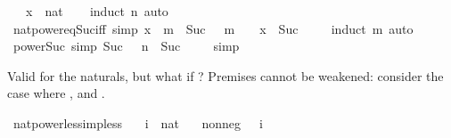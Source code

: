 \begin{isabellebody}
\ \ \ x\ {\isacharcolon}{\kern0pt}{\isacharcolon}{\kern0pt}\ nat\isanewline
%
\isadelimproof
\ \ %
\endisadelimproof
%
\isatagproof
{}\isamarkupfalse%
\ {\isacharparenleft}{\kern0pt}induct\ n{\isacharparenright}{\kern0pt}\ auto%
\endisatagproof
{\isafoldproof}%
%
\isadelimproof
\isanewline
%
\endisadelimproof
\isanewline
{}\isamarkupfalse%
\ nat{\isacharunderscore}{\kern0pt}power{\isacharunderscore}{\kern0pt}eq{\isacharunderscore}{\kern0pt}Suc{\isacharunderscore}{\kern0pt}{}{\isacharunderscore}{\kern0pt}iff\ {\isacharbrackleft}{\kern0pt}simp{\isacharbrackright}{\kern0pt}{\isacharcolon}{\kern0pt}\ {\isachardoublequoteopen}x\ {\isacharcircum}{\kern0pt}\ m\ {\isacharequal}{\kern0pt}\ Suc\ {}\ {\isasymlongleftrightarrow}\ m\ {\isacharequal}{\kern0pt}\ {}\ {\isasymor}\ x\ {\isacharequal}{\kern0pt}\ Suc\ {}{\isachardoublequoteclose}\isanewline
%
\isadelimproof
\ \ %
\endisadelimproof
%
\isatagproof
{}\isamarkupfalse%
\ {\isacharparenleft}{\kern0pt}induct\ m{\isacharparenright}{\kern0pt}\ auto%
\endisatagproof
{\isafoldproof}%
%
\isadelimproof
\isanewline
%
\endisadelimproof
\isanewline
{}\isamarkupfalse%
\ power{\isacharunderscore}{\kern0pt}Suc{\isacharunderscore}{\kern0pt}{}\ {\isacharbrackleft}{\kern0pt}simp{\isacharbrackright}{\kern0pt}{\isacharcolon}{\kern0pt}\ {\isachardoublequoteopen}Suc\ {}\ {\isacharcircum}{\kern0pt}\ n\ {\isacharequal}{\kern0pt}\ Suc\ {}{\isachardoublequoteclose}\isanewline
%
\isadelimproof
\ \ %
\endisadelimproof
%
\isatagproof
{}\isamarkupfalse%
\ simp%
\endisatagproof
{\isafoldproof}%
%
\isadelimproof
%
\endisadelimproof
%
\begin{isamarkuptext}%
Valid for the naturals, but what if ? Premises cannot be
  weakened: consider the case where ,  and .%
\end{isamarkuptext}\isamarkuptrue%
\isamarkupfalse%
\ nat{\isacharunderscore}{\kern0pt}power{\isacharunderscore}{\kern0pt}less{\isacharunderscore}{\kern0pt}imp{\isacharunderscore}{\kern0pt}less{\isacharcolon}{\kern0pt}\isanewline
\ \ \ i\ {\isacharcolon}{\kern0pt}{\isacharcolon}{\kern0pt}\ nat\isanewline
\ \ \ nonneg{\isacharcolon}{\kern0pt}\ {\isachardoublequoteopen}{}\ {\isacharless}{\kern0pt}\ i{\isachardoublequoteclose}\isanewline

\end{isabellebody}
